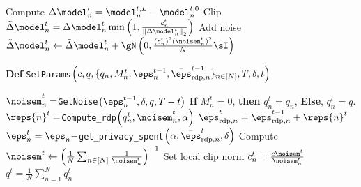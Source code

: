\begin{minipage}{0.50\textwidth}
\begin{algorithm}[H]
\begin{algorithmic}[1]
\EndFor
\EndFor
\State Compute $\Delta\model_n^t = \model_n^{t,L} - \model_n^{t,0}$
\State {}
\State Clip $\tilde{\Delta}\model_n^{t} = \Delta\model_n^t\min\left(1,\frac{c_n^t}{\left\|\Delta\model_n^{t}\right\|_2}\right)$  
\State Add noise $\tilde{\Delta}\model_n^t \gets \tilde{\Delta}\model_n^t + \gN\left(0,\frac{(c_n^t)^2(\noisem_n^t)^2}{N}\sI\right)$
\State {} 
\Statex
\end{algorithmic}
\textbf{Def} \texttt{SetParams}$\left(c, q,  \{q_n, M_n^t, \eps_n^{t-1}, \bar{\eps}_{\text{rdp},n}^{t-1}\}_{n\in [N]}, T, \delta, t \right)$
\begin{algorithmic}[1]
\State  $\bar{\noisem}_n^t=$\texttt{GetNoise}$\left(\eps_n^{t-1},\delta, q, T-t\right)$
\State {}
\State \textbf{If} $M_n^t=0$, \textbf{then} $q_n^t = q_n$, \textbf{Else}, $q_n^t = q$.
\State $\reps{n}^t=$\texttt{Compute\_rdp}$\left(q_n^t,\bar{\noisem}_n^t, \alpha\right)$
\State $\bar{\eps}_{\text{rdp},n}^t = \bar{\eps}_{\text{rdp},n}^{t-1} +  \reps{n}^t$
\State $\eps_n^t=\eps_n-$\texttt{get\_privacy\_spent}$\left(\alpha, \bar{\eps}_{\text{rdp},n}^t,\delta\right)$
\EndFor
\State Compute $\noisem^t \gets \left(\frac{1}{N}\sum_{n\in [N]}\frac{1}{\noisem_n^t}\right)^{-1}$
\State Set local clip norm $c_n^t=\frac{c\noisem^t}{\noisem_n^t}$
\EndFor
\State $q^t = \frac{1}{N} \sum_{n=1}^N q_n^t$
\State {}
\Statex
\end{algorithmic}
\begin{algorithmic}[1]
\State {}
\State {}
\State {}
\State {}
\State {}
\end{algorithmic}
\end{algorithm}
\end{minipage}